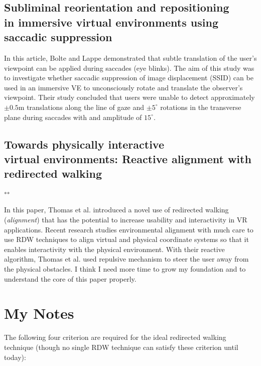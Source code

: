 \documentclass[12pt]{article}
\begin{document}
\subsection[Subliminal reorientation and repositioning in immersive virtual environments using saccadic suppression]{Subliminal reorientation and repositioning\\ in immersive virtual environments using saccadic suppression}
\textbf{\cite{bolte2015subliminal}}

In this article, Bolte and Lappe demonstrated that subtle translation of the user's viewpoint can be applied during saccades (eye blinks). The aim of this study was to investigate whether saccadic suppression of image displacement (SSID) can be used in an immersive VE to unconsciously rotate and translate the observer's viewpoint. Their study concluded that users were unable to detect approximately $\pm 0.5$m translations along the line of gaze and $\pm 5^{\circ}$ rotations in the transverse plane during saccades with and amplitude of $15^{\circ}$.

\subsection[Towards physically interactive virtual environments: Reactive alignment with redirected walking]{Towards physically interactive\\ virtual environments: Reactive alignment with redirected walking}
\textbf{\cite{thomas2020towards}}\textsuperscript{**}

In this paper, Thomas et al. introduced a novel use of redirected walking (\emph{alignment}) that has the potential to increase usability and interactivity in VR applications. Recent research studies environmental alignment with much care to use RDW techniques to align virtual and physical coordinate systems so that it enables interactivity with the physical environment. With their reactive algorithm, Thomas et al. used repulsive mechanism to steer the user away from the physical obstacles. I think I need more time to grow my foundation and to understand the core of this paper properly.

\section{My Notes}

The following four criterion are required for the ideal redirected walking technique (though no single RDW technique can satisfy these criterion until today):
\end{document}
